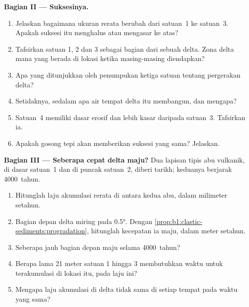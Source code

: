 \begin{problem}
\medskip
\noindent\textbf{Bagian II --- Suksesinya.}
\begin{enumerate}[resume]
  \item Jelaskan bagaimana ukuran rerata berubah dari satuan~1 ke satuan~3. Apakah suksesi itu menghalus atau mengasar ke atas?
  \item Tafsirkan satuan 1, 2 dan 3 sebagai bagian dari sebuah delta. Zona delta mana yang berada di lokasi ketika masing-masing diendapkan?
  \item Apa yang ditunjukkan oleh penumpukan ketiga satuan tentang pergerakan delta?
  \item Setidaknya, sedalam apa air tempat delta itu membangun, dan mengapa?
  \item Satuan~4 memiliki dasar erosif dan lebih kasar daripada satuan~3. Tafsirkan ia.
  \item Apakah gosong tepi akan memberikan suksesi yang sama? Jelaskan.
\end{enumerate}

\medskip
\noindent\textbf{Bagian III --- Seberapa cepat delta maju?}
Dua lapisan tipis abu vulkanik, di dasar satuan~1 dan di puncak satuan~2, diberi tarikh; keduanya berjarak \num{4000}~tahun.
\begin{enumerate}[resume]
  \item Hitunglah laju akumulasi rerata di antara kedua abu, dalam milimeter setahun.
  \item Bagian depan delta miring pada \ang{0.5}. Dengan \cref{prop:b1:clastic-sediments:progradation}, hitunglah kecepatan ia maju, dalam meter setahun.
  \item Seberapa jauh bagian depan maju selama \num{4000}~tahun?
  \item Berapa lama 21 meter satuan 1 hingga 3 membutuhkan waktu untuk terakumulasi di lokasi itu, pada laju ini?
  \item Mengapa laju akumulasi di delta tidak sama di setiap tempat pada waktu yang sama?
\end{enumerate}


\end{problem}
